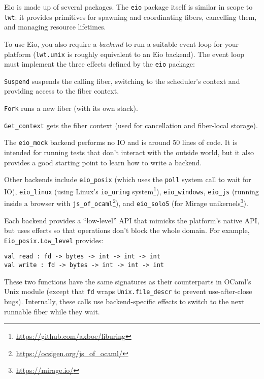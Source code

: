 \documentclass[a4paper,twocolumn]{article}
\begin{document}
Eio is made up of several packages.
The \verb|eio| package itself is similar in scope to \verb|lwt|:
it provides primitives for spawning and coordinating fibers, cancelling them, and managing resource lifetimes.

To use Eio, you also require a \emph{backend} to run a suitable event loop for your platform
(\verb|lwt.unix| is roughly equivalent to an Eio backend).
The event loop must implement the three effects defined by the \verb|eio| package:

\begin{description}
	\item{\verb|Suspend|} suspends the calling fiber, switching to the scheduler's context and providing access to the fiber context.
	\item{\verb|Fork|} runs a new fiber (with its own stack).
	\item{\verb|Get_context|} gets the fiber context (used for cancellation and fiber-local storage).
\end{description}

The \verb|eio_mock| backend performs no IO and is around 50 lines of code.
It is intended for running tests that don't interact with the outside world,
but it also provides a good starting point to learn how to write a backend.

Other backends include \verb|eio_posix| (which uses the \verb|poll| system call to wait for IO),
\verb|eio_linux| (using Linux's \verb|io_uring| system\footnote{\url{https://github.com/axboe/liburing}}),
\verb|eio_windows|,
\verb|eio_js| (running inside a browser with \verb|js_of_ocaml|\footnote{\url{https://ocsigen.org/js_of_ocaml/}}),
and \verb|eio_solo5| (for Mirage unikernels\footnote{\url{https://mirage.io/}}).

Each backend provides a ``low-level'' API that mimicks the platform's native API, but uses effects so that operations don't block the whole domain. For example, \verb|Eio_posix.Low_level| provides:

\begin{lstlisting}[style=ocaml,basicstyle=\small]
val read : fd -> bytes -> int -> int -> int
val write : fd -> bytes -> int -> int -> int
\end{lstlisting}

These two functions have the same signatures as their counterparts in OCaml's Unix module
(except that \verb|fd| wraps \verb|Unix.file_descr| to prevent use-after-close bugs).
Internally, these calls use backend-specific effects to switch to the next runnable fiber while they wait.
\end{document}
